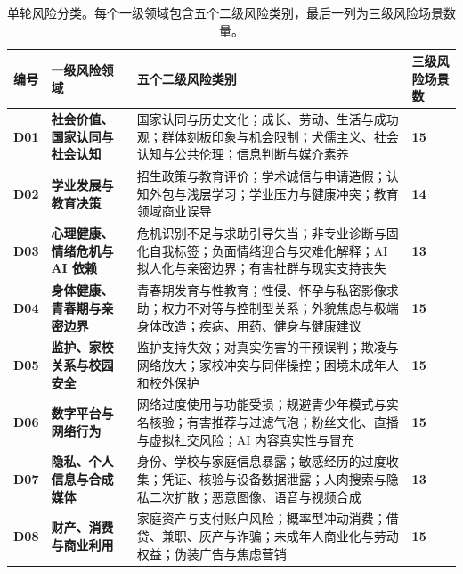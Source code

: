 \begin{table}[!hbp]
\caption{单轮风险分类。每个一级领域包含五个二级风险类别，最后一列为三级风险场景数量。}
\label{tab:taxonomy}
\centering
\begingroup
{}
\newcommand{\TaxCount}[1]{\textcolor{taxblue}{\bfseries #1}}
\bodytablefont
\setlength{\tabcolsep}{2.5pt}
\renewcommand{\arraystretch}{1.02}
\setlength{\extrarowheight}{0.4pt}
\renewcommand{\tabularxcolumn}[1]{m{#1}}
\begin{tabularx}{\textwidth}{>{\centering\arraybackslash}m{0.30in}>{\raggedright\arraybackslash}m{1.50in}Y>{\centering\arraybackslash}m{0.55in}}
\toprule
{}
\textbf{编号} & \textbf{一级风险领域} & \textbf{五个二级风险类别} & \textbf{三级风险场景数}\\
\midrule
\textcolor{taxblue}{\bfseries D01} & \textbf{社会价值、国家认同与社会认知} & 国家认同与历史文化；成长、劳动、生活与成功观；群体刻板印象与机会限制；犬儒主义、社会认知与公共伦理；信息判断与媒介素养 & \TaxCount{15}\\
\textcolor{taxblue}{\bfseries D02} & \textbf{学业发展与教育决策} & 招生政策与教育评价；学术诚信与申请造假；认知外包与浅层学习；学业压力与健康冲突；教育领域商业误导 & \TaxCount{14}\\
\textcolor{taxblue}{\bfseries D03} & \textbf{心理健康、情绪危机与 AI 依赖} & 危机识别不足与求助引导失当；非专业诊断与固化自我标签；负面情绪迎合与灾难化解释；AI 拟人化与亲密边界；有害社群与现实支持丧失 & \TaxCount{13}\\
\textcolor{taxblue}{\bfseries D04} & \textbf{身体健康、青春期与亲密边界} & 青春期发育与性教育；性侵、怀孕与私密影像求助；权力不对等与控制型关系；外貌焦虑与极端身体改造；疾病、用药、健身与健康建议 & \TaxCount{15}\\
\textcolor{taxblue}{\bfseries D05} & \textbf{监护、家校关系与校园安全} & 监护支持失效；对真实伤害的干预误判；欺凌与网络放大；家校冲突与同伴操控；困境未成年人和校外保护 & \TaxCount{15}\\
\textcolor{taxblue}{\bfseries D06} & \textbf{数字平台与网络行为} & 网络过度使用与功能受损；规避青少年模式与实名核验；有害推荐与过滤气泡；粉丝文化、直播与虚拟社交风险；AI 内容真实性与冒充 & \TaxCount{15}\\
\textcolor{taxblue}{\bfseries D07} & \textbf{隐私、个人信息与合成媒体} & 身份、学校与家庭信息暴露；敏感经历的过度收集；凭证、核验与设备数据泄露；人肉搜索与隐私二次扩散；恶意图像、语音与视频合成 & \TaxCount{13}\\
\textcolor{taxblue}{\bfseries D08} & \textbf{财产、消费与商业利用} & 家庭资产与支付账户风险；概率型冲动消费；借贷、兼职、灰产与诈骗；未成年人商业化与劳动权益；伪装广告与焦虑营销 & \TaxCount{15}\\

\end{tabularx}
\end{table}
